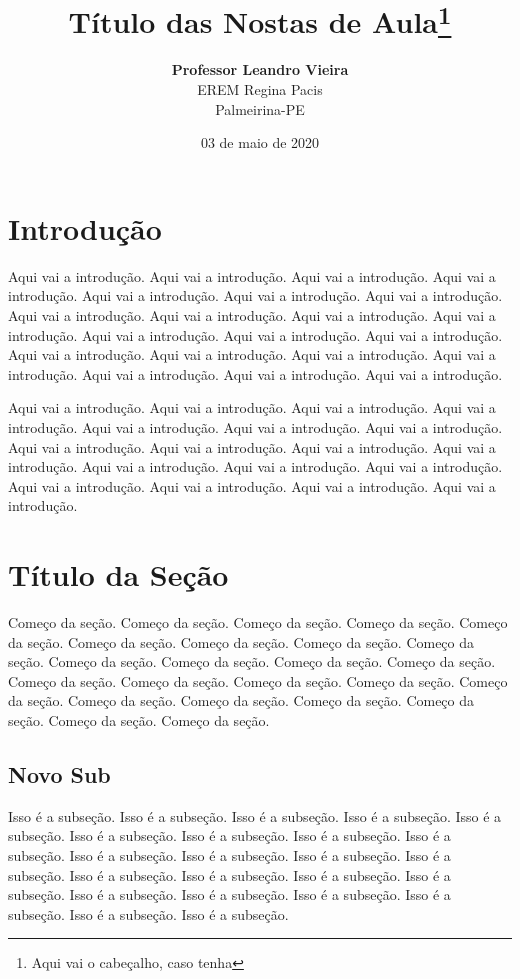\documentclass[oneside,a4paper,12pt]{article}
\title{Título das Nostas de Aula\footnote{Aqui vai o cabeçalho, caso tenha}}
\author{\textbf{Professor Leandro Vieira}\\EREM Regina Pacis\\Palmeirina-PE}
\date{03 de maio de 2020}
\begin{document}
\maketitle

\tableofcontents

\section{Introdução}

Aqui vai a introdução. Aqui vai a introdução. Aqui vai a introdução.
Aqui vai a introdução. Aqui vai a introdução. Aqui vai a introdução.
Aqui vai a introdução. Aqui vai a introdução. Aqui vai a introdução.
Aqui vai a introdução. Aqui vai a introdução. Aqui vai a introdução.
Aqui vai a introdução. Aqui vai a introdução. Aqui vai a introdução.
Aqui vai a introdução. Aqui vai a introdução. Aqui vai a introdução.
Aqui vai a introdução. Aqui vai a introdução. Aqui vai a introdução.

Aqui vai a introdução. Aqui vai a introdução. Aqui vai a introdução.
Aqui vai a introdução. Aqui vai a introdução. Aqui vai a introdução.
Aqui vai a introdução. Aqui vai a introdução. Aqui vai a introdução.
Aqui vai a introdução. Aqui vai a introdução. Aqui vai a introdução.
Aqui vai a introdução. Aqui vai a introdução. Aqui vai a introdução.
Aqui vai a introdução. Aqui vai a introdução. Aqui vai a introdução.


\section{Título da Seção}

Começo da seção. Começo da seção. Começo da seção. Começo da seção. Começo da seção. Começo da seção. Começo da seção. Começo da seção. Começo da seção. Começo da seção. Começo da seção. Começo da seção. Começo da seção. Começo da seção. Começo da seção. Começo da seção. Começo da seção. Começo da seção. Começo da seção. Começo da seção. Começo da seção. Começo da seção. Começo da seção. Começo da seção.

\subsection{Novo Sub}

Isso é a subseção. Isso é a subseção. Isso é a subseção. Isso é a subseção. Isso é a subseção. Isso é a subseção. Isso é a subseção. Isso é a subseção. Isso é a subseção. Isso é a subseção. Isso é a subseção. Isso é a subseção. Isso é a subseção. Isso é a subseção. Isso é a subseção. Isso é a subseção. Isso é a subseção. Isso é a subseção. Isso é a subseção. Isso é a subseção. Isso é a subseção. Isso é a subseção. Isso é a subseção. 
\end{document}
